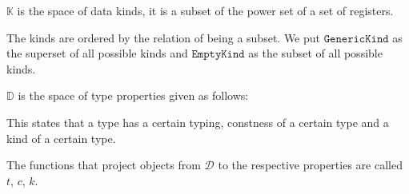 \begin{defn}
    $\mathbb{K}$ is the space of data kinds, it is a subset of the power set of a set of registers.

    The kinds are ordered by the relation of being a subset. We put $\mathtt{GenericKind}$ as the superset of all possible kinds and $\mathtt{EmptyKind}$ as the subset of all possible kinds.
\end{defn}

\begin{defn}
    $\mathbb{D}$ is the space of type properties given as follows:
    \begin{algorithmic}
    \end{algorithmic}

    This states that a type has a certain typing, constness of a certain type and a kind of a certain type.

    The functions that project objects from $\mathcal{D}$ to the respective properties are called $t$, $c$, $k$.
\end{defn}




